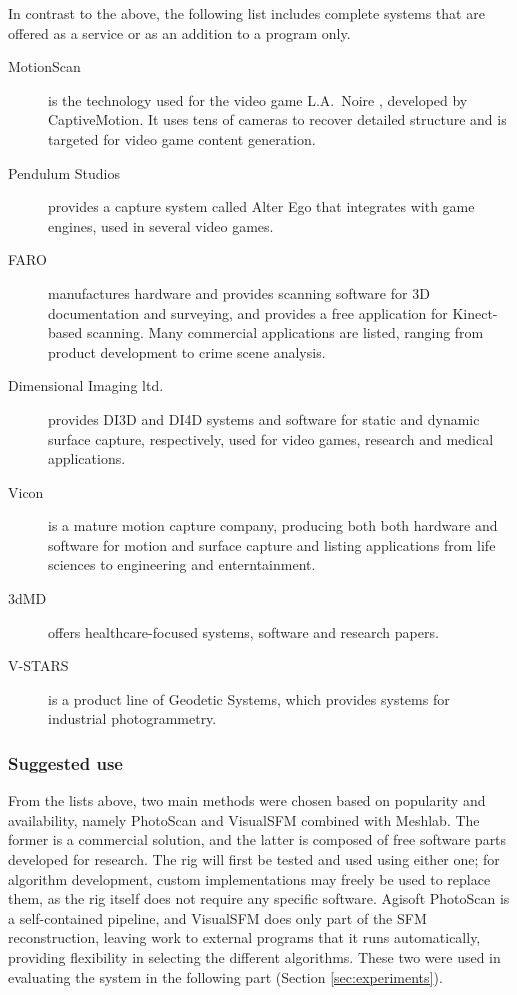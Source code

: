 In contrast to the above, the following list includes complete systems that are offered as a service or as an addition to a program only.

\begin{description}
	\item[MotionScan] is the technology used for the video game L.A.\ Noire \cite{rockstar2011noire}, developed by CaptiveMotion. It uses tens of cameras to recover detailed structure and is targeted for video game content generation.

	\item[Pendulum Studios] \cite{alterego} provides a capture system called Alter Ego that integrates with game engines, used in several video games.

	\item [FARO] \cite{faro} manufactures hardware and provides scanning software for 3D documentation and surveying, and provides a free application for Kinect-based scanning. Many commercial applications are listed, ranging from product development to crime scene analysis.

	\item[Dimensional Imaging ltd.] \cite{di4d} provides DI3D and DI4D systems and software for static and dynamic surface capture, respectively, used for video games, research and medical applications.

	\item[Vicon] \cite{vicon} is a mature motion capture company, producing both both hardware and software for motion and surface capture and listing applications from life sciences to engineering and enterntainment.

	\item[3dMD] \cite{3dmd} offers healthcare-focused systems, software and research papers.

	\item[V-STARS] \cite{vstars} is a product line of Geodetic Systems, which provides systems for industrial photogrammetry.
\end{description}

\subsubsection{Suggested use} %

From the lists above, two main methods were chosen based on popularity and availability, namely PhotoScan and VisualSFM combined with Meshlab.
The former is a commercial solution, and the latter is composed of free software parts developed for research.
The rig will first be tested and used using either one; for algorithm development, custom implementations may freely be used to replace them, as the rig itself does not require any specific software.
Agisoft PhotoScan is a self-contained pipeline, and VisualSFM does only part of the SFM reconstruction, leaving work to external programs that it runs automatically, providing flexibility in selecting the different algorithms.
These two were used in evaluating the system in the following part (Section \ref{sec:experiments}).

